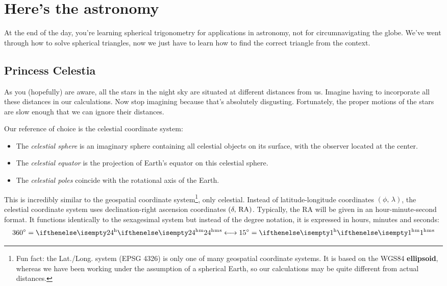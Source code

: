 \documentclass{article}
\begin{document}
\section{Here's the astronomy}
At the end of the day, you're learning spherical trigonometry for applications in astronomy, not for circumnavigating the globe. We've went through how to solve spherical triangles, now we just have to learn how to find the correct triangle from the context. 

\subsection{Princess Celestia}
As you (hopefully) are aware, all the stars in the night sky are situated at different distances from us. Imagine having to incorporate all these distances in our calculations. Now stop imagining because that's absolutely disgusting. Fortunately, the proper motions of the stars are slow enough that we can ignore their distances.

Our reference of choice is the celestial coordinate system:
\begin{itemize}
    \item The \textit{celestial sphere} is an imaginary sphere containing all celestial objects on its surface, with the observer located at the center.
    \item The \textit{celestial equator} is the projection of Earth's equator on this celestial sphere. 
    \item The \textit{celestial poles} coincide with the rotational axis of the Earth.
\end{itemize}

This is incredibly similar to the geospatial coordinate system\footnote{Fun fact: the Lat./Long. system (EPSG 4326) is only one of many geospatial coordinate systems. It is based on the WGS84 \textbf{ellipsoid}, whereas we have been working under the assumption of a spherical Earth, so our calculations may be quite different from actual distances.}, only celestial. Instead of latitude-longitude coordinates $(\phi,\,\lambda)$, the celestial coordinate system uses declination-right ascension coordinates $(\delta,\,\mathrm{RA})$. Typically, the RA will be given in an hour-minute-second format. It functions identically to the sexagesimal system but instead of the degree notation, it is expressed in hours, minutes and seconds:
\begin{equation}
    \label{eqn:time_conversion}
    360\degree = \hms{24}{}{} \longleftrightarrow 15\degree = \hms{1}{}{}
\end{equation}
\end{document}
